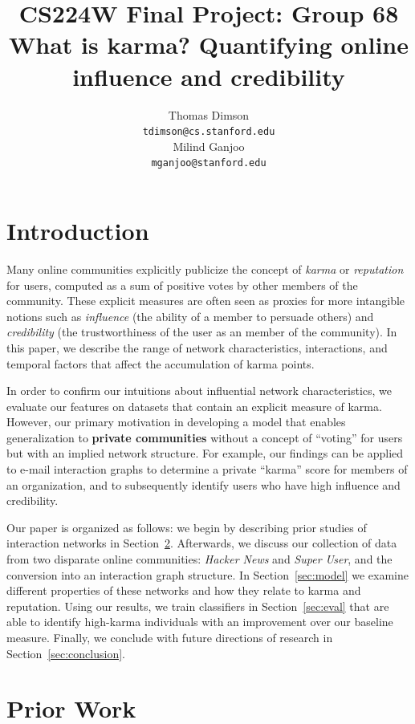 \documentclass[11pt]{article}
\title{{\small CS224W Final Project: Group 68} \\ What is karma? Quantifying online influence and credibility}
\author{Thomas Dimson \\
  {\tt tdimson@cs.stanford.edu}
  \\\And
  Milind Ganjoo \\
  {\tt mganjoo@stanford.edu} 
}
\date{}
\begin{document}
\maketitle

\newcommand{\citet}[1]{\cite{#1}}

\section{Introduction}

Many online communities explicitly publicize the concept of \textit{karma} or
\textit{reputation} for users, computed as a sum of positive votes by other members of
the community. These explicit measures are often seen as proxies for more
intangible notions such as \textit{influence} (the ability of a member to
persuade others) and \textit{credibility} (the trustworthiness of the user as an
member of the community). In this paper, we describe the range of network
characteristics, interactions, and temporal factors that affect the accumulation
of karma points. 

In order to confirm our intuitions about influential network characteristics, 
we evaluate our features on datasets that contain an explicit
measure of karma. However, our primary motivation in developing a model that
enables generalization to \textbf{private communities} without a concept
of ``voting'' for users but with an implied network structure. For example, 
our findings can be applied to e-mail interaction graphs to 
determine a private ``karma'' score for members
of an organization, and to subsequently identify users who have high influence
and credibility.

Our paper is organized as follows: we begin by describing prior studies of
interaction networks in Section~\ref{sec:prior}. Afterwards, we discuss 
our collection of data from two disparate online communities: 
\textit{Hacker News} and \textit{Super User}, and the conversion into 
an interaction graph structure. In Section~\ref{sec:model} we 
examine different properties of these networks and
how they relate to karma and reputation. Using our results, we train
classifiers in Section~\ref{sec:eval} that are able to identify high-karma
individuals with an improvement over our baseline measure. Finally, we 
conclude with future directions of research in Section~\ref{sec:conclusion}.

\section{Prior Work}
\label{sec:prior}
\end{document}

